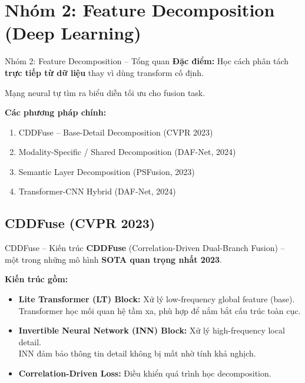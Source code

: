 \documentclass{beamer}
\begin{document}
\section{Nhóm 2: Feature Decomposition (Deep Learning)}

\begin{frame}{Nhóm 2: Feature Decomposition -- Tổng quan}
    \textbf{Đặc điểm:} Học cách phân tách \textbf{trực tiếp từ dữ liệu} thay vì dùng transform cố định.

    \vspace{0.2cm}
    Mạng neural tự tìm ra biểu diễn tối ưu cho fusion task.

    \vspace{0.3cm}
    \textbf{Các phương pháp chính:}
    \begin{enumerate}
        \item CDDFuse -- Base-Detail Decomposition (CVPR 2023)
        \item Modality-Specific / Shared Decomposition (DAF-Net, 2024)
        \item Semantic Layer Decomposition (PSFusion, 2023)
        \item Transformer-CNN Hybrid (DAF-Net, 2024)
    \end{enumerate}
\end{frame}

\subsection{CDDFuse (CVPR 2023)}

\begin{frame}{CDDFuse -- Kiến trúc}
    \textbf{CDDFuse} (Correlation-Driven Dual-Branch Fusion) -- một trong những mô hình \textbf{SOTA quan trọng nhất 2023}.

    \vspace{0.2cm}
    \textbf{Kiến trúc gồm:}
    \begin{itemize}
        \item \textbf{Lite Transformer (LT) Block:} Xử lý low-frequency global feature (base). \\
        Transformer học mối quan hệ tầm xa, phù hợp để nắm bắt cấu trúc toàn cục.
        \item \textbf{Invertible Neural Network (INN) Block:} Xử lý high-frequency local detail. \\
        INN đảm bảo thông tin detail không bị mất nhờ tính khả nghịch.
        \item \textbf{Correlation-Driven Loss:} Điều khiển quá trình học decomposition.
    \end{itemize}
\end{frame}
\end{document}
